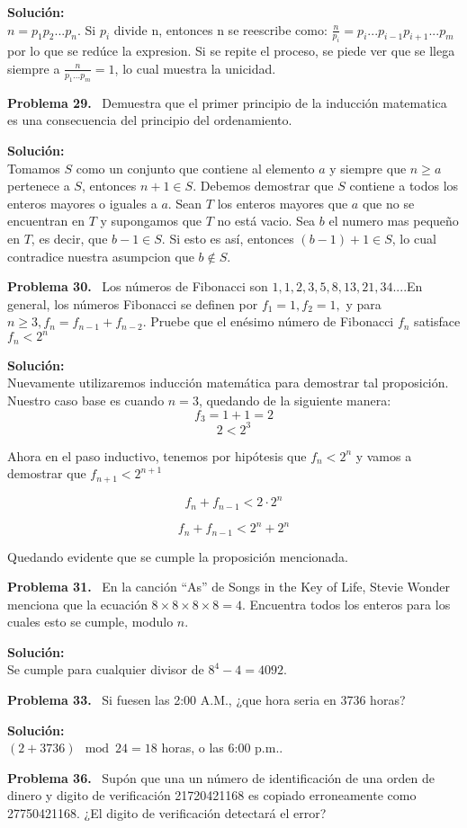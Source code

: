 \documentclass{article}
\newcounter{problem}
\newcounter{solution}
\newcommand\Problem[1]{%
  \stepcounter{problem}%
  \textbf{Problema #1.}~%
  \setcounter{solution}{0}%
}
\newcommand\TheSolution{%
  \textbf{Solución:}\\%
}
\begin{document}
\TheSolution{}
$n = p_{1} p_{2}... p_{n}$. Si $p_{i}$ divide n, entonces n se reescribe como:
$\frac{n}{p_{i}} = p_{i} ... p_{i-1} p_{i+1} ... p_{m}$ por lo que se redúce la
expresion. Si se repite el proceso, se piede ver que se llega siempre a
$\frac{n}{p_{1} ... p_{m}} = 1$, lo cual muestra la unicidad.

\Problem{29} Demuestra que el primer principio de la inducción matematica es
una consecuencia del principio del ordenamiento.

\TheSolution{}
Tomamos $S$ como un conjunto que contiene al elemento $a$ y siempre que $n
\geq a$ pertenece a $S$, entonces $n + 1 \in S$. Debemos demostrar que $S$
contiene a todos los enteros mayores o iguales a $a$. Sean $T$ los enteros
mayores que $a$ que no se encuentran en $T$ y supongamos que $T$ no está vacio.
Sea $b$ el numero mas pequeño en $T$, es decir, que $b - 1 \in S$. Si esto es
así, entonces $(b - 1) + 1 \in S$, lo cual contradice nuestra asumpcion que $b
\nin S$.

\Problem{30} Los n\'umeros de Fibonacci son $1,1,2,3,5,8,13,21,34....$En
general, los n\'umeros Fibonacci se definen por $f_{1}=1,f_{2}=1,$ y para
$n\geq3, f_{n} = f_{n-1}+f_{n-2}$. Pruebe que el en\'esimo n\'umero de
Fibonacci $f_{n}$ satisface $f_{n}< 2^{n}$

\TheSolution{}
Nuevamente utilizaremos inducci\'on matem\'atica para demostrar tal
proposici\'on. Nuestro caso base es cuando $n=3$, quedando de la siguiente
manera:$$f_{3}=1+1=2$$ $$2 < 2^{3}$$

Ahora en el paso inductivo, tenemos por hip\'otesis que $f_{n}< 2^{n}$ y vamos
a demostrar que $f_{n+1} < 2^{n+1}$

$$f_{n}+f_{n-1} < 2\cdot2^{n}$$

$$f_{n}+f_{n-1} < 2^{n} + 2^{n}$$

Quedando evidente que se cumple la proposici\'on mencionada.

\Problem{31} En la canción ``As'' de Songs in the Key of Life, Stevie Wonder
menciona que la ecuación $8 \times 8 \times 8 \times 8 = 4$. Encuentra todos
los enteros para los cuales esto se cumple, modulo $n$.

\TheSolution{}
Se cumple para cualquier divisor de $8^4 - 4 = 4092$.

\Problem{33} Si fuesen las 2:00 A.M., ¿que hora seria en 3736 horas?

\TheSolution{}
$(2 + 3736) \mod 24 = 18$ horas, o las 6:00 p.m..

\Problem{36} Supón que una un número de identificación de una orden de dinero y
digito de verificación 21720421168 es copiado erroneamente como 27750421168.
¿El digito de verificación detectará el error?
\end{document}
